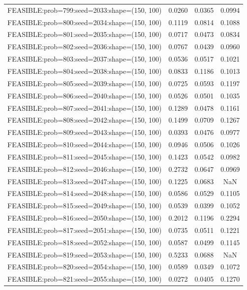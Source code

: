\begin{longtable}{lccc}
FEASIBLE:prob=799:seed=2033:shape=(150, 100) & 0.0260 & 0.0365 & 0.0994 \\
FEASIBLE:prob=800:seed=2034:shape=(150, 100) & 0.1119 & 0.0814 & 0.1088 \\
FEASIBLE:prob=801:seed=2035:shape=(150, 100) & 0.0717 & 0.0473 & 0.0834 \\
FEASIBLE:prob=802:seed=2036:shape=(150, 100) & 0.0767 & 0.0439 & 0.0960 \\
FEASIBLE:prob=803:seed=2037:shape=(150, 100) & 0.0536 & 0.0517 & 0.1021 \\
FEASIBLE:prob=804:seed=2038:shape=(150, 100) & 0.0833 & 0.1186 & 0.1013 \\
FEASIBLE:prob=805:seed=2039:shape=(150, 100) & 0.0725 & 0.0593 & 0.1197 \\
FEASIBLE:prob=806:seed=2040:shape=(150, 100) & 0.0526 & 0.0501 & 0.1035 \\
FEASIBLE:prob=807:seed=2041:shape=(150, 100) & 0.1289 & 0.0478 & 0.1161 \\
FEASIBLE:prob=808:seed=2042:shape=(150, 100) & 0.1499 & 0.0709 & 0.1267 \\
FEASIBLE:prob=809:seed=2043:shape=(150, 100) & 0.0393 & 0.0476 & 0.0977 \\
FEASIBLE:prob=810:seed=2044:shape=(150, 100) & 0.0946 & 0.0506 & 0.1026 \\
FEASIBLE:prob=811:seed=2045:shape=(150, 100) & 0.1423 & 0.0542 & 0.0982 \\
FEASIBLE:prob=812:seed=2046:shape=(150, 100) & 0.2732 & 0.0647 & 0.0969 \\
FEASIBLE:prob=813:seed=2047:shape=(150, 100) & 0.1225 & 0.0683 &    NaN \\
FEASIBLE:prob=814:seed=2048:shape=(150, 100) & 0.0586 & 0.0529 & 0.1105 \\
FEASIBLE:prob=815:seed=2049:shape=(150, 100) & 0.0539 & 0.0399 & 0.1052 \\
FEASIBLE:prob=816:seed=2050:shape=(150, 100) & 0.2012 & 0.1196 & 0.2294 \\
FEASIBLE:prob=817:seed=2051:shape=(150, 100) & 0.0735 & 0.0511 & 0.1221 \\
FEASIBLE:prob=818:seed=2052:shape=(150, 100) & 0.0587 & 0.0499 & 0.1145 \\
FEASIBLE:prob=819:seed=2053:shape=(150, 100) & 0.5233 & 0.0688 &    NaN \\
FEASIBLE:prob=820:seed=2054:shape=(150, 100) & 0.0589 & 0.0349 & 0.1072 \\
FEASIBLE:prob=821:seed=2055:shape=(150, 100) & 0.0272 & 0.0405 & 0.1270 \\

\end{longtable}
